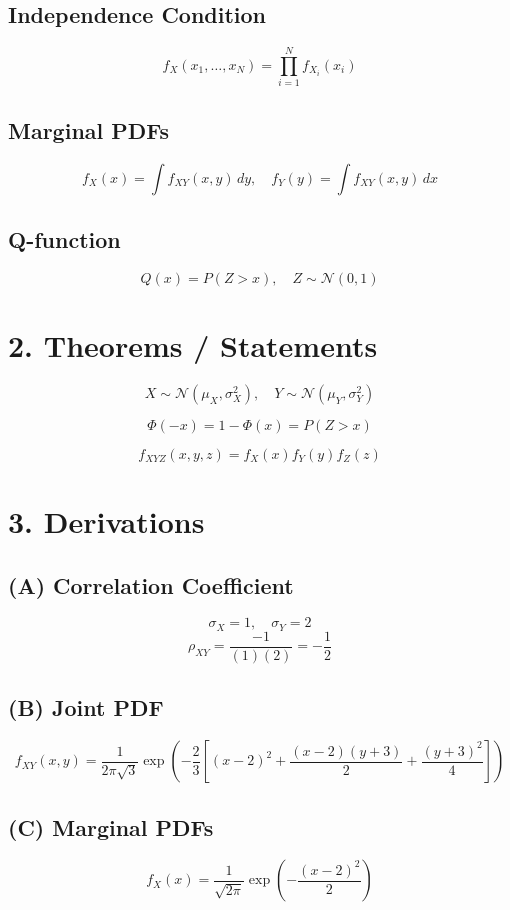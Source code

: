 \documentclass[12pt]{article}
\begin{document}
\subsection*{Independence Condition}
\[
f_X(x_1,\dots,x_N)=\prod_{i=1}^{N} f_{X_i}(x_i)
\]

\subsection*{Marginal PDFs}
\[
f_X(x)=\int f_{XY}(x,y)\,dy, \quad
f_Y(y)=\int f_{XY}(x,y)\,dx
\]

\subsection*{Q-function}
\[
Q(x)=P(Z>x), \quad Z\sim \mathcal{N}(0,1)
\]

\section*{2. Theorems / Statements}

\[
X \sim \mathcal{N}(\mu_X,\sigma_X^2), \quad
Y \sim \mathcal{N}(\mu_Y,\sigma_Y^2)
\]

\[
\Phi(-x)=1-\Phi(x)=P(Z>x)
\]

\[
f_{XYZ}(x,y,z)=f_X(x)f_Y(y)f_Z(z)
\]

\section*{3. Derivations}

\subsection*{(A) Correlation Coefficient}
\[
\sigma_X=1,\quad \sigma_Y=2
\]
\[
\rho_{XY}=\frac{-1}{(1)(2)}=-\frac{1}{2}
\]

\subsection*{(B) Joint PDF}
\[
f_{XY}(x,y)=\frac{1}{2\pi\sqrt{3}}
\exp\left(
-\frac{2}{3}\left[
(x-2)^2 + \frac{(x-2)(y+3)}{2} + \frac{(y+3)^2}{4}
\right]
\right)
\]

\subsection*{(C) Marginal PDFs}
\[
f_X(x)=\frac{1}{\sqrt{2\pi}} \exp\left(-\frac{(x-2)^2}{2}\right)
\]
\end{document}
